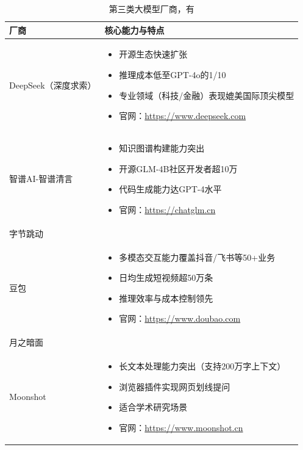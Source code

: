 \documentclass{article}
\begin{document}
\begin{table}[htbp]
  \centering
  \begin{tabular}{|p{3cm}|p{12cm}|}
    \hline
    \textbf{厂商} & \textbf{核心能力与特点} \\
    \hline
    DeepSeek（深度求索） &
    \begin{itemize}
      \item 开源生态快速扩张
      \item 推理成本低至GPT-4o的1/10
      \item 专业领域（科技/金融）表现媲美国际顶尖模型
      \item 官网：\url{https://www.deepseek.com}
    \end{itemize} \\
    \hline
    智谱AI-智谱清言 &
    \begin{itemize}
      \item 知识图谱构建能力突出
      \item 开源GLM-4B社区开发者超10万
      \item 代码生成能力达GPT-4水平
      \item 官网：\url{https://chatglm.cn}
    \end{itemize} \\
    \hline
    字节跳动 \\ 豆包 &
    \begin{itemize}
      \item 多模态交互能力覆盖抖音/飞书等50+业务
      \item 日均生成短视频超50万条
      \item 推理效率与成本控制领先
      \item 官网：\url{https://www.doubao.com}
    \end{itemize} \\
    \hline
    月之暗面 \\ Moonshot &
    \begin{itemize}
      \item 长文本处理能力突出（支持200万字上下文）
      \item 浏览器插件实现网页划线提问
      \item 适合学术研究场景
      \item 官网：\url{https://www.moonshot.cn}
    \end{itemize} \\
    \hline
  \end{tabular}
  \caption{第三类大模型厂商，有}
\end{table}
\end{document}

